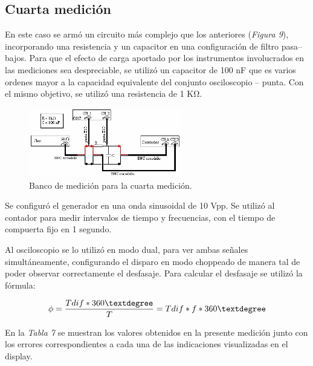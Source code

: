 \documentclass{article}
\begin{document}
\subsection{Cuarta medición}
\medskip

	En este caso se armó un circuito más complejo que los anteriores (\textit{Figura 9}), incorporando una resistencia y un capacitor en una configuración de filtro pasa–bajos. Para que el efecto de carga aportado por los instrumentos involucrados en las mediciones sea despreciable, se utilizó un capacitor de 100 nF que es varios ordenes mayor a la capacidad equivalente del conjunto osciloscopio – punta. Con el mismo objetivo, se utilizó una resistencia de 1 KΩ.
\bigskip


\begin{figure}[h]
	\centering
	\includegraphics[width=0.60\textwidth]{images/09-bancoMedicionMed4.jpg}
	\medskip
	\caption{Banco de medición para la cuarta medición.}
\end{figure}
\bigskip\bigskip


	Se configuró el generador en una onda sinusoidal de 10 Vpp. Se utilizó al contador para medir  intervalos de tiempo y frecuencias, con el tiempo de compuerta fijo en 1 segundo.
	\par
	Al osciloscopio se lo utilizó en modo dual, para ver ambas señales simultáneamente, configurando el disparo en modo choppeado de manera tal de poder observar correctamente el desfasaje. Para calcular el desfasaje se utilizó la fórmula:

\begin{equation}
	\phi = {Tdif * 360° \over T} = {Tdif * f * 360°}
\end{equation}
\medskip


	En la \textit{Tabla 7} se muestran los valores obtenidos en la presente medición junto con los errores correspondientes a cada una de las indicaciones visualizadas en el display.
\bigskip
\end{document}
